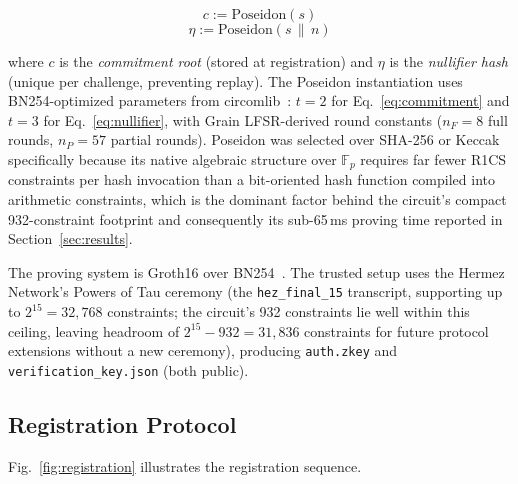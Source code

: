 \documentclass[journal,twoside,10pt]{IEEEtran}
\begin{document}
\begin{equation}
  c := \mathrm{Poseidon}(s) \label{eq:commitment}
\end{equation}
\begin{equation}
  \eta := \mathrm{Poseidon}(s \,\|\, n) \label{eq:nullifier}
\end{equation}

\noindent where $c$ is the \textit{commitment root} (stored at registration)
and $\eta$ is the \textit{nullifier hash} (unique per challenge, preventing
replay). The Poseidon instantiation uses BN254-optimized parameters from
circomlib~\cite{poseidon}: $t=2$ for Eq.~\ref{eq:commitment} and $t=3$ for
Eq.~\ref{eq:nullifier}, with Grain LFSR-derived round constants
($n_F = 8$ full rounds, $n_P = 57$ partial rounds). Poseidon was selected
over SHA-256 or Keccak specifically because its native algebraic structure
over $\mathbb{F}_p$ requires far fewer R1CS constraints per hash invocation
than a bit-oriented hash function compiled into arithmetic constraints,
which is the dominant factor behind the circuit's compact 932-constraint
footprint and consequently its sub-65\,ms proving time reported in
Section~\ref{sec:results}.

The proving system is Groth16 over BN254~\cite{groth16}. The trusted setup
uses the Hermez Network's Powers of Tau ceremony (the \texttt{hez\_final\_15}
transcript, supporting up to $2^{15} = 32{,}768$ constraints; the circuit's
932 constraints lie well within this ceiling, leaving headroom of
$2^{15}-932 = 31{,}836$ constraints for future protocol extensions without a
new ceremony), producing \texttt{auth.zkey} and
\texttt{verification\_key.json} (both public).

\subsection{Registration Protocol}

Fig.~\ref{fig:registration} illustrates the registration sequence.
\end{document}
